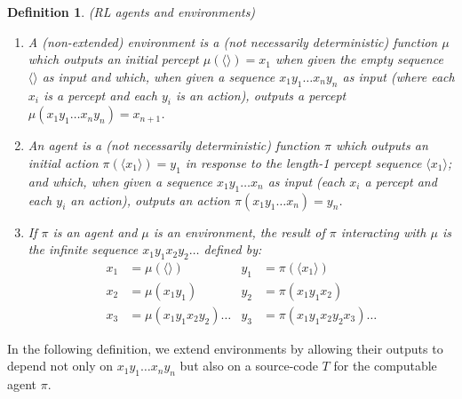 \documentclass{article}
\newtheorem{mydefinition}[mytheorem]{Definition}
\begin{document}
\begin{mydefinition}
\label{agentenvironmentdefn}
(RL agents and environments)
  \begin{enumerate}
    \item
    A (non-extended) \emph{environment} is a (not necessarily
    deterministic) function $\mu$ which outputs an initial
    percept $\mu(\langle\rangle)=x_1$ when given the empty sequence $\langle\rangle$
    as input
    and which, when given a sequence $x_1y_1\ldots x_ny_n$
    as input (where each $x_i$ is a percept and each
    $y_i$ is an action), outputs a percept
    $\mu(x_1y_1\ldots x_ny_n)=x_{n+1}$.
    \item
    An \emph{agent} is a (not necessarily deterministic)
    function $\pi$ which outputs an initial action $\pi(\langle x_1\rangle)=y_1$
    in response to the length-1 percept sequence $\langle x_1\rangle$;
    and which, when given a sequence $x_1y_1\ldots x_n$ as input
    (each $x_i$ a percept and each $y_i$ an action),
    outputs an action $\pi(x_1y_1\ldots x_n)=y_n$.
    \item
    If $\pi$ is an agent and $\mu$ is an environment, the \emph{result of
    $\pi$ interacting with $\mu$} is the infinite sequence
    $x_1y_1x_2y_2\ldots$ defined by:
    \begin{align*}
      x_1 &= \mu(\langle\rangle) & y_1 &= \pi(\langle x_1\rangle)\\
      x_2 &= \mu(x_1y_1) & y_2 &= \pi(x_1y_1x_2)\\
      x_3 &= \mu(x_1y_1x_2y_2)\ldots & y_3 &= \pi(x_1y_1x_2y_2x_3) \ldots
    \end{align*}
  \end{enumerate}
\end{mydefinition}

In the following definition,
we extend environments by allowing their outputs to depend not only on
$x_1y_1\ldots x_ny_n$ but also on a source-code $T$ for the computable agent $\pi$.
\end{document}

